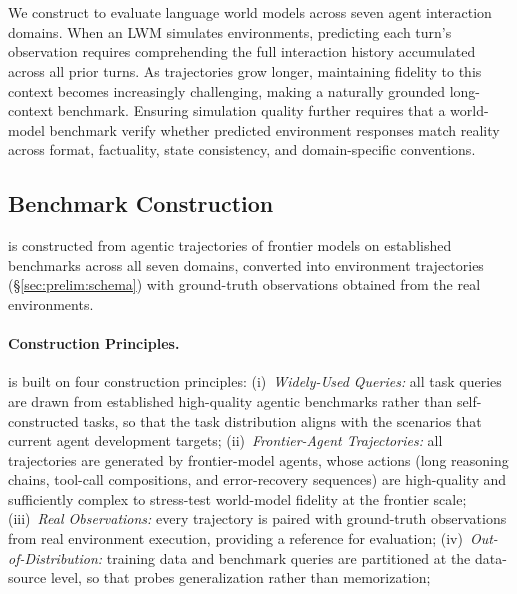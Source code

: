 \section{\bench}
\label{sec:bench}

We construct \textbf{\bench} to evaluate language world models across seven agent interaction domains.
When an LWM simulates environments, predicting each turn's observation requires comprehending the full interaction history accumulated across all prior turns.
As trajectories grow longer, maintaining fidelity to this context becomes increasingly challenging, making \bench a naturally grounded long-context benchmark.
Ensuring simulation quality further requires that a world-model benchmark verify whether predicted environment responses match reality across format, factuality, state consistency, and domain-specific conventions.

\subsection{Benchmark Construction}
\label{sec:bench:construction}

\bench is constructed from agentic trajectories of frontier models on established benchmarks across all seven domains, converted into environment trajectories (\S\ref{sec:prelim:schema}) with ground-truth observations obtained from the real environments.


\paragraph{Construction Principles.}
\bench is built on four construction principles:
(i)~\emph{Widely-Used Queries:} all task queries are drawn from established high-quality agentic benchmarks rather than self-constructed tasks, so that the task distribution aligns with the scenarios that current agent development targets;
(ii)~\emph{Frontier-Agent Trajectories:} all trajectories are generated by frontier-model agents, whose actions (long reasoning chains, tool-call compositions, and error-recovery sequences) are high-quality and sufficiently complex to stress-test world-model fidelity at the frontier scale;
(iii)~\emph{Real Observations:} every trajectory is paired with ground-truth observations from real environment execution, providing a reference for evaluation;
(iv)~\emph{Out-of-Distribution:} training data and benchmark queries are partitioned at the data-source level, so that \bench probes generalization rather than memorization;

